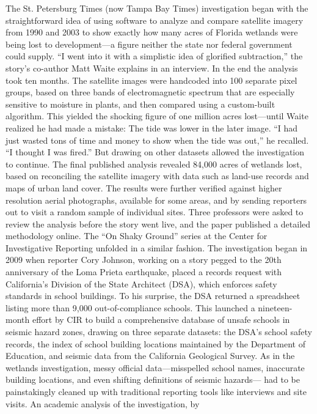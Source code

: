 The St. Petersburg Times (now Tampa Bay Times) investigation began with
the straightforward idea of using software to analyze and compare satellite
imagery from 1990 and 2003 to show exactly how many acres of Florida
wetlands were being lost to development—a figure neither the state nor federal
government could supply. ``I went into it with a simplistic idea of glorified
subtraction,'' the story's co-author Matt Waite explains in an interview.
In the end the analysis took ten months. The satellite images were handcoded
into 100 separate pixel groups, based on three bands of electromagnetic
spectrum that are especially sensitive to moisture in plants, and then
compared using a custom-built algorithm. This yielded the shocking figure
of one million acres lost—until Waite realized he had made a mistake: The
tide was lower in the later image. ``I had just wasted tons of time and money
to show when the tide was out,'' he recalled. ``I thought I was fired.'' But
drawing on other datasets allowed the investigation to continue. The final
published analysis revealed 84,000 acres of wetlands lost, based on reconciling
the satellite imagery with data such as land-use records and maps of
urban land cover. The results were further verified against higher resolution
aerial photographs, available for some areas, and by sending reporters out
to visit a random sample of individual sites. Three professors were asked
to review the analysis before the story went live, and the paper published a
detailed methodology online.
The ``On Shaky Ground'' series at the Center for Investigative Reporting
unfolded in a similar fashion. The investigation began in 2009 when reporter
Cory Johnson, working on a story pegged to the 20th anniversary of the
Loma Prieta earthquake, placed a records request with California's Division
of the State Architect (DSA), which enforces safety standards in school
buildings. To his surprise, the DSA returned a spreadsheet listing more than 9,000 out-of-compliance schools. This launched a nineteen-month effort by
CIR to build a comprehensive database of unsafe schools in seismic hazard
zones, drawing on three separate datasets: the DSA's school safety records,
the index of school building locations maintained by the Department of
Education, and seismic data from the California Geological Survey. As in
the wetlands investigation, messy official data—misspelled school names,
inaccurate building locations, and even shifting definitions of seismic hazards—
had to be painstakingly cleaned up with traditional reporting tools
like interviews and site visits. An academic analysis of the investigation, by
